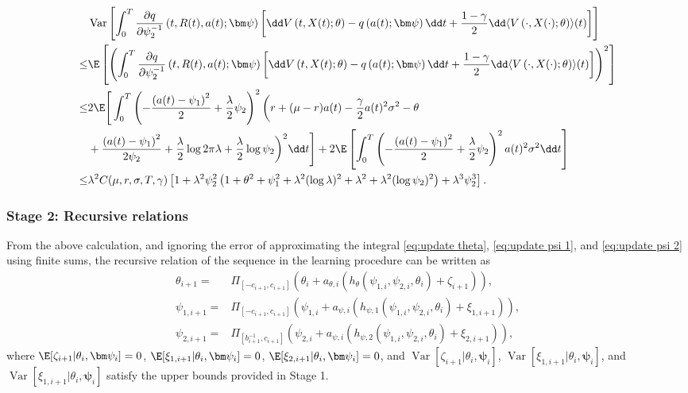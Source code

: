 \[ \begin{aligned}
& \operatorname{Var}\left[  \int_0^T \frac{\partial q}{\partial \psi_2^{-1}}\left(t, R(t), a(t);\bm\psi \right) \left[ \dd V\left(t , X(t);\theta  \right) - q\left( a(t) ;\bm\psi\right)\dd t + \frac{1-\gamma}{2}\dd \langle V\left( \cdot,X(\cdot);\theta \right)\rangle(t)  \right]  \right] \\
\leq & \E\left[ \left( \int_0^T \frac{\partial q}{\partial \psi_2^{-1}}\left(t, R(t), a(t);\bm\psi \right) \left[ \dd V\left(t , X(t);\theta  \right) - q\left( a(t) ;\bm\psi\right)\dd t + \frac{1-\gamma}{2}\dd \langle V\left( \cdot,X(\cdot);\theta \right)\rangle(t)  \right] \right)^2 \right] \\
\leq & 2\E\Bigg[ \int_0^T \left( -\frac{\left( a(t) - \psi_1 \right)^2}{2} + \frac{\lambda}{2}\psi_2 \right)^2 \bigg( r + (\mu - r)a(t) - \frac{\gamma}{2}a(t)^2\sigma^2  -\theta \\
& +  \frac{\left( a(t) - \psi_{1} \right)^2}{2\psi_{2}} + \frac{\lambda}{2}\log2\pi\lambda + \frac{\lambda}{2}\log\psi_{2} \bigg)^2\dd t \Bigg] + 2\E\left[\int_0^T \left( -\frac{\left( a(t) - \psi_1 \right)^2}{2} + \frac{\lambda}{2}\psi_2  \right)^2  a(t)^2\sigma^2\dd t \right]\\
\leq & \lambda^2 C(\mu,r,\sigma,T,\gamma)\left[ 1 + \lambda^2\psi_2^2 \left( 1 + \theta^2 + \psi_1^2 + \lambda^2(\log\lambda)^2 + \lambda^2 + \lambda^2(\log\psi_2)^2\right)  +  \lambda^3\psi_2^3  \right] .
\end{aligned} \]
\subsubsection{Stage 2: Recursive relations}
From the above calculation, and ignoring the error of approximating the integral \eqref{eq:update theta}, \eqref{eq:update psi 1}, and \eqref{eq:update psi 2} using finite sums, the recursive relation of the sequence in the learning procedure can be written as 
\begin{equation}
\label{eq:projection recusive}
\begin{aligned}
\theta_{i+1} = & \Pi_{[-c_{i+1}, c_{i+1}]}\left( \theta_i + a_{\theta,i} \left( h_{\theta}(\psi_{1,i},\psi_{2,i},\theta_i) + \zeta_{i+1}  \right) \right),\\
\psi_{1,i+1} = & \Pi_{[-c_{i+1}, c_{i+1}]}\left( \psi_{1,i} + a_{\psi,i} \left( h_{\psi,1}(\psi_{1,i},\psi_{2,i},\theta_i) + \xi_{1,i+1}  \right) \right),\\
\psi_{2,i+1} = & \Pi_{[b_{i+1}^{-1}, c_{i+1}]}\left(  \psi_{2,i} + a_{\psi,i} \left( h_{\psi,2}(\psi_{1,i},\psi_{2,i},\theta_i) + \xi_{2,i+1} \right) \right) ,
\end{aligned}
\end{equation}
where $\E[\zeta_{i+1}|\theta_i,\bm\psi_i] = 0$, $\E[\xi_{1,i+1}|\theta_i,\bm\psi_i] = 0$, $\E[\xi_{2,i+1}|\theta_i,\bm\psi_i] = 0$, and $\operatorname{Var}[\zeta_{i+1}|\theta_i,\bm\psi_i]$, $\operatorname{Var}[\xi_{1,i+1}|\theta_i,\bm\psi_i]$, and $\operatorname{Var}[\xi_{1,i+1}|\theta_i,\bm\psi_i]$ satisfy the upper bounds provided in Stage 1.

